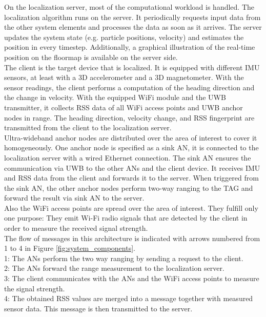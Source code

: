\noindent\hspace*{5mm}%
On the localization server, most of the computational workload is handled. The localization algorithm runs on the server. It periodically requests input data from the other system elements and processes the data as soon as it arrives. The server updates the system state (e.g. particle positions, velocity) and estimates the position in every timestep. Additionally, a graphical illustration of the real-time position on the floormap is available on the server side. \\
\noindent\hspace*{5mm}%
The client is the target device that is localized. It is equipped with different IMU sensors, at least with a 3D accelerometer and a 3D magnetometer. With the sensor readings, the client performs a computation of the heading direction and the change in velocity. With the equipped WiFi module and the UWB transmitter, it collects RSS data of all WiFi access points and UWB anchor nodes in range. The heading direction, velocity change, and RSS fingerprint are transmitted from the client to the localization server.\\
\noindent\hspace*{5mm}%
Ultra-wideband anchor nodes are distributed over the area of interest to cover it homogeneously. One anchor node is specified as a sink AN, it is connected to the localization server with a wired Ethernet connection. The sink AN ensures the communication via UWB to the other ANs and the client device. It receives IMU and RSS data from the client and forwards it to the server. When triggered from the sink AN, the other anchor nodes perform two-way ranging to the TAG and forward the result via sink AN to the server.\\
\noindent\hspace*{5mm}%
Also the WiFi access points are spread over the area of interest. They fulfill only one purpose: They emit Wi-Fi radio signals that are detected by the client in order to measure the received signal strength.\\
\noindent\hspace*{5mm}%
The flow of messages in this architecture is indicated with arrows numbered from 1 to 4 in Figure \ref{fig:system_components}.\\
1: The ANs perform the two way ranging by sending a request to the client.\\
2: The ANs forward the range measurement to the localization server.\\
3: The client communicates with the ANs and the WiFi access points to measure the signal strength.\\
4: The obtained RSS values are merged into a message together with measured sensor data. This message is then transmitted to the server.


